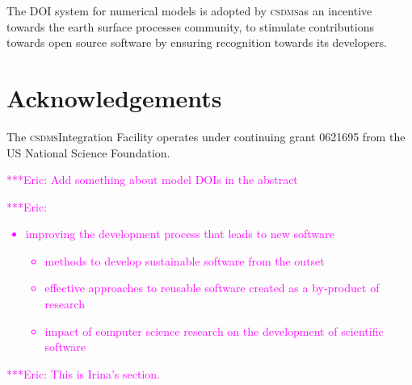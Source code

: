 \documentclass[11pt, oneside]{amsart}
\newcommand{\huttonnote}[1]{ {\textcolor{magenta}    { ***Eric:      #1 }}}
\DeclareRobustCommand{\csdms}{\textsc{csdms}}
\begin{document}
The DOI system for numerical models is adopted by
\csdms as an incentive towards the earth surface processes community, to
stimulate contributions towards open source software by ensuring recognition
towards its developers.


\section{Acknowledgements}

The \csdms Integration Facility operates under continuing grant 0621695 from the
US National Science Foundation.



{}

\huttonnote{Add something about model DOIs in the abstract}

\huttonnote{
\begin{itemize}
\item improving the development process that leads to new software
  \begin{itemize}
  \item methods to develop sustainable software from the outset
  \item effective approaches to reusable software created as a by-product of
        research
  \item impact of computer science research on the development of scientific software
  \end{itemize}
\end{itemize}
}

\huttonnote{This is Irina's section.}
\end{document}
